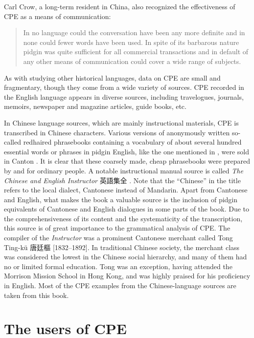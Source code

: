 \documentclass[english,output=paper,colorlinks,citecolor=brown]{../langscibook}
\begin{document}
Carl Crow, a long-term resident in China, also recognized the effectiveness of CPE as a means of communication:

\begin{quote}
    In no language could the conversation have been any more definite and in none could fewer words have been used. In spite of its barbarous nature pidgin was quite sufficient for all commercial transactions and in default of any other means of communication could cover a wide range of subjects. \citep[31]{Crow2011}
\end{quote}

As with studying other historical languages, data on CPE are small and fragmentary, though they come from a wide variety of sources. CPE recorded in the English language appears in diverse sources, including travelogues, journals, memoirs, newspaper and magazine articles, guide books, etc.

In Chinese language sources, which are mainly instructional materials, CPE is transcribed in Chinese characters. Various versions of anonymously written so-called redhaired phrasebooks containing a vocabulary of about several hundred essential words or phrases in pidgin English, like the one mentioned in \citet{Hunter1882}, were sold in Canton \citep{Bolton2003}. It is clear that these coarsely made, cheap phrasebooks were prepared by and for ordinary people. A notable instructional manual source is called \textit{The Chinese and English Instructor} {\cjkfont 英語集全} \citep{Tong1862}. Note that the “Chinese” in the title refers to the local dialect, Cantonese instead of Mandarin. Apart from Cantonese and English, what makes the book a valuable source is the inclusion of pidgin equivalents of Cantonese and English dialogues in some parts of the book. Due to the comprehensiveness of its content and the systematicity of the transcription, this source is of great importance to the grammatical analysis of CPE. The compiler of the \textit{Instructor} was a prominent Cantonese merchant called Tong Ting-kü {\cjkfont 唐廷樞} [1832--1892]. In traditional Chinese society, the merchant class was considered the lowest in the Chinese social hierarchy, and many of them had no or limited formal education. Tong was an exception, having attended the Morrison Mission School in Hong Kong, and was highly praised for his proficiency in English. Most of the CPE examples from the Chinese-language sources are taken from this book.

\section{The users of CPE}\label{sec:7:4}
\end{document}
